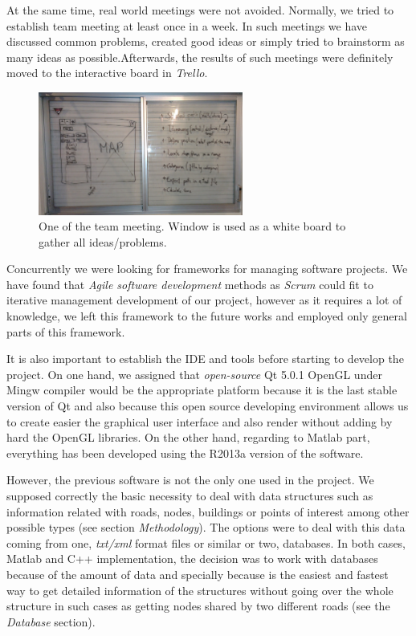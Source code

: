 \documentclass{article}
\begin{document}
At the same time, real world meetings were not avoided. Normally, we tried to establish team meeting at least once in a week. In such meetings we have discussed common problems, created good ideas or simply tried to brainstorm as many ideas as possible.Afterwards, the results of such meetings were definitely moved to the interactive board in \textit{Trello}.

\begin{figure}[!h]
\centering
\includegraphics[width=0.6\textwidth]{windowBoard.jpg}
\caption{One of the team meeting. Window is used as a white board to gather all ideas/problems.}
\end{figure}

Concurrently we were looking for frameworks for managing software projects. We have found that \textit{Agile software development} methods as \textit{Scrum} could fit to iterative management development of our project, however as it requires a lot of knowledge, we left this framework to the future works and employed only general parts of this framework.

It is also important to establish the IDE and tools before starting to develop the project. On one hand, we assigned that \textit{open-source} Qt 5.0.1 OpenGL under Mingw compiler would be the appropriate platform because it is the last stable version of Qt and also because this open source developing environment allows us to create easier the graphical user interface and also render without adding by hard the OpenGL libraries. On the other hand, regarding to Matlab part, everything has been developed using the R2013a version of the software.

However, the previous software is not the only one used in the project. We supposed correctly the basic necessity to deal with data structures such as information related with roads, nodes, buildings or points of interest among other possible types (see section \textit{Methodology}). The options were to deal with this data coming from one, \textit{txt/xml} format files or similar or two, databases.
In both cases, Matlab and C++ implementation, the decision was to work with databases because of the amount of data and specially because is the easiest and fastest way to get detailed information of the structures without going over the whole structure in such cases as getting nodes shared by two different roads (see the \textit{Database} section).
\end{document}
